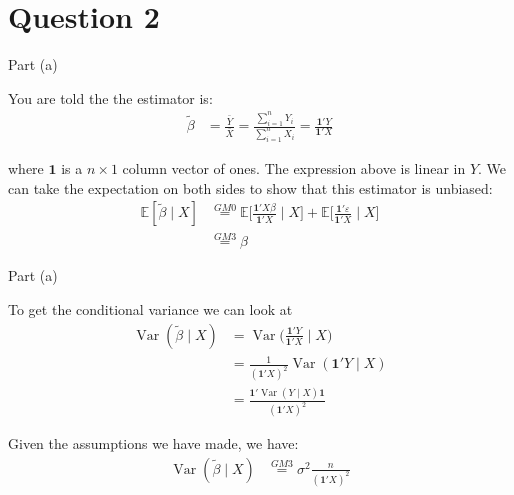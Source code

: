 \section{Question 2}

\begin{frame}{Part (a)}

    You are told the the estimator is:
    \begin{align*}
        \tilde{\beta} &= \frac{\bar{Y}}{\bar{X}} = \frac{\sum_{i=1}^n Y_i}{\sum_{i=1}^n X_i} = \frac{\mathbf{1}' Y}{\mathbf{1}' X}
    \end{align*}
    
    where $\mathbf{1}$ is a $n \times 1$ column vector of ones. The expression above is linear in $Y$. We can take the expectation on both sides to show that this estimator is unbiased:
    \begin{align*}
        \mathbb{E} [ \tilde{\beta} \mid X] &\overset{GM0}{=} \mathbb{E} \Biggr[ \frac{\mathbf{1}' X \beta}{\mathbf{1}' X} \mid X \Biggr] + \mathbb{E} \Biggr[ \frac{\mathbf{1}' \varepsilon}{\mathbf{1}' X} \mid X \Biggr]
        \\
         &\overset{GM3}{=} \beta
    \end{align*}
    
\end{frame}

\begin{frame}{Part (a)}

    To get the conditional variance we can look at
    \begin{align*}
        \operatorname{Var} (\tilde{\beta} \mid X ) &= \operatorname{Var} \Biggr( \frac{\mathbf{1}' Y}{\mathbf{1}' X} \mid X \Biggr)
        \\
        &= \frac{1}{( \mathbf{1}' X)^2} \operatorname{Var} ( \mathbf{1}' Y \mid X )
        \\
        &= \frac{\mathbf{1}' \operatorname{Var} (Y \mid X) \mathbf{1}}{( \mathbf{1}' X)^2}
    \end{align*}
    
    Given the assumptions we have made, we have:
    \begin{align*}
        \operatorname{Var} (\tilde{\beta} \mid X ) &\overset{GM3}{=} \sigma^2 \frac{n}{(\mathbf{1}' X)^2}
    \end{align*}
    
\end{frame}

